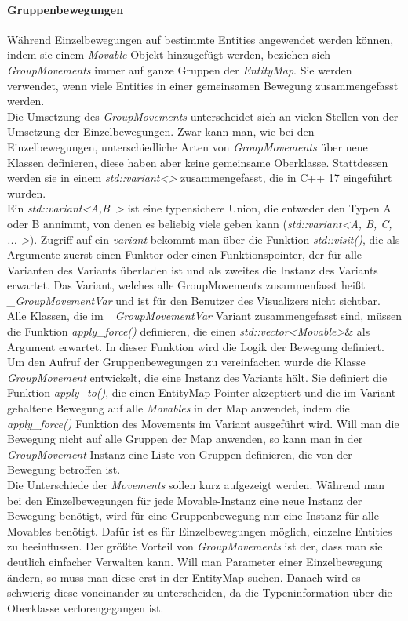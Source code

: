 \documentclass[11pt,a4paper]{article}
\begin{document}
\paragraph{Gruppenbewegungen}
Während Einzelbewegungen auf bestimmte Entities angewendet werden können, indem sie einem \textit{Movable} Objekt hinzugefügt werden, beziehen sich \textit{GroupMovements} immer auf ganze Gruppen der \textit{EntityMap}. Sie werden verwendet, wenn viele Entities in einer gemeinsamen Bewegung zusammengefasst werden.\\
Die Umsetzung des \textit{GroupMovements} unterscheidet sich an vielen Stellen von der Umsetzung der Einzelbewegungen. Zwar kann man, wie bei den Einzelbewegungen, unterschiedliche Arten von \textit{GroupMovements} über neue Klassen definieren, diese haben aber keine gemeinsame Oberklasse. Stattdessen werden sie in einem \textit{std::variant\textless \textgreater} zusammengefasst, die in C++ 17 eingeführt wurden.\\
Ein \mbox{\textit{std::variant\textless A,B \textgreater}} ist eine  typensichere Union, die entweder den Typen A oder B annimmt, von denen es beliebig viele geben kann (\textit{std::variant\textless A, B, C, ... \textgreater}). Zugriff auf ein \textit{variant} bekommt man über die Funktion \textit{std::visit()}, die als Argumente zuerst einen Funktor oder einen Funktionspointer, der für alle Varianten des Variants überladen ist und als zweites die Instanz des Variants erwartet. Das Variant, welches alle GroupMovements zusammenfasst heißt \textit{\_GroupMovementVar} und ist für den Benutzer des Visualizers nicht sichtbar. Alle Klassen, die im \textit{\_GroupMovementVar} Variant zusammengefasst sind, müssen die Funktion \textit{apply\_force()} definieren, die einen \textit{std::vector\textless Movable\textgreater}\& als Argument erwartet. In dieser Funktion wird die Logik der Bewegung definiert.\\
Um den Aufruf der Gruppenbewegungen zu vereinfachen wurde die Klasse \textit{GroupMovement} entwickelt, die eine Instanz des Variants hält. Sie definiert die Funktion \textit{apply\_to()}, die einen EntityMap Pointer akzeptiert und die im Variant gehaltene Bewegung auf alle \textit{Movables} in der Map anwendet, indem die \textit{apply\_force()} Funktion des Movements im Variant ausgeführt wird. Will man die Bewegung nicht auf alle Gruppen der Map anwenden, so kann man in der \textit{GroupMovement}-Instanz eine Liste von Gruppen definieren, die von der Bewegung betroffen ist.\\
Die Unterschiede der \textit{Movements} sollen kurz aufgezeigt werden. Während man bei den Einzelbewegungen für jede Movable-Instanz eine neue Instanz der Bewegung benötigt, wird für eine Gruppenbewegung nur eine Instanz für alle Movables benötigt. Dafür ist es für Einzelbewegungen möglich, einzelne Entities zu beeinflussen. Der größte Vorteil von \textit{GroupMovements} ist der, dass man sie deutlich einfacher Verwalten kann. Will man Parameter einer Einzelbewegung ändern, so muss man diese erst in der EntityMap suchen. Danach wird es schwierig diese voneinander zu unterscheiden, da die Typeninformation über die Oberklasse verlorengegangen ist.\\
\end{document}
